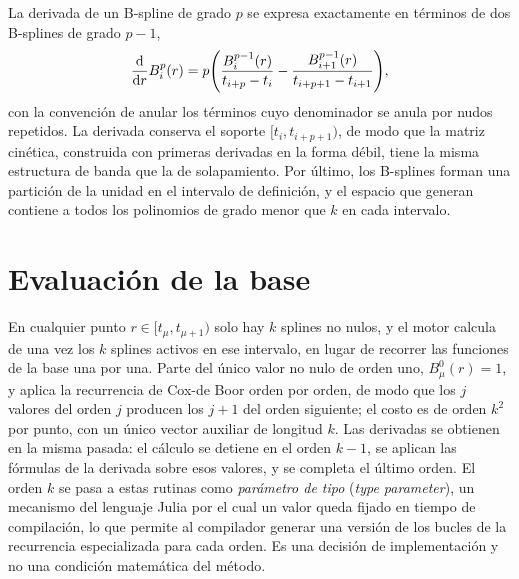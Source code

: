 \begin{table}[htbp]
    \centering
    
    \caption[Parámetros de la base de B-splines de cada elemento]{Base de B-splines de cada elemento en los cálculos de este trabajo: radio de la caja, número de intervalos de la malla exponencial, orden $k$ del spline (grado $k-1$), parámetro $\gamma$ de la Ecuación \eqref{eq:exp-grid} y número de funciones de la base.}
    \label{tab:parametros_base}
\end{table}

La derivada de un B-spline de grado $p$ se expresa exactamente en términos de dos B-splines de grado $p-1$,
\begin{equation}
    \dv{r} B_i^p(r) = p \qty( \frac{B_i^{p-1}(r)}{t_{i+p}-t_i} - \frac{B_{i+1}^{p-1}(r)}{t_{i+p+1}-t_{i+1}} ),
\end{equation}
con la convención de anular los términos cuyo denominador se anula por nudos repetidos. La derivada conserva el soporte $[t_i, t_{i+p+1})$, de modo que la matriz cinética, construida con primeras derivadas en la forma débil, tiene la misma estructura de banda que la de solapamiento. Por último, los B-splines forman una partición de la unidad en el intervalo de definición, y el espacio que generan contiene a todos los polinomios de grado menor que $k$ en cada intervalo.

\section{Evaluación de la base}

En cualquier punto $r \in [t_\mu, t_{\mu+1})$ solo hay $k$ splines no nulos, y el motor calcula de una vez los $k$ splines activos en ese intervalo, en lugar de recorrer las funciones de la base una por una. Parte del único valor no nulo de orden uno, $B_{\mu}^0(r) = 1$, y aplica la recurrencia de Cox-de Boor orden por orden, de modo que los $j$ valores del orden $j$ producen los $j+1$ del orden siguiente; el costo es de orden $k^2$ por punto, con un único vector auxiliar de longitud $k$. Las derivadas se obtienen en la misma pasada: el cálculo se detiene en el orden $k-1$, se aplican las fórmulas de la derivada sobre esos valores, y se completa el último orden. El orden $k$ se pasa a estas rutinas como \textit{parámetro de tipo} (\textit{type parameter}), un mecanismo del lenguaje Julia por el cual un valor queda fijado en tiempo de compilación, lo que permite al compilador generar una versión de los bucles de la recurrencia especializada para cada orden. Es una decisión de implementación y no una condición matemática del método.

